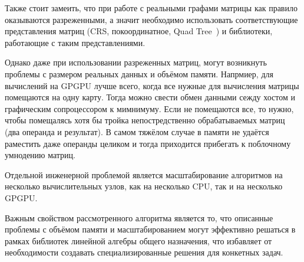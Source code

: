 Также стоит замеить, что при работе с реальными графами матрицы как правило оказываются разреженными, а значит необходимо использовать соответствующие представления матриц (CRS, покоординатное, Quad Tree~\cite{quadtree}) и библиотеки, работающие с таким представлениями. 

Однако даже при использовании разреженных матриц, могут возникнуть проблемы с размером реальных данных и объёмом памяти. Напрмиер, для вычислений на GPGPU лучше всего, когда все нужные для вычисления матрицы помещаются на одну карту. Тогда можно свести обмен данными сежду хостом и графическим сопроцессором к мимнимуму. Если не помещаются все, то нужно, чтобы помещалясь хотя бы тройка непостредственно обрабатываемых матриц (два операнда и результат). В самом тяжёлом случае в памяти не удаётся раместить даже операнды целиком и тогда приходится прибегать к поблочному умнодению матриц.

Отдельной инженерной проблемой является масштабирование алгоритмов на несколько вычислительных узлов, как на несколько CPU, так и на несколько GPGPU.

Важным свойством рассмотренного алгоритма является то, что описанные проблемы с объёмом памяти и масштабированием могут эффективно решаться в рамках библиотек линейной алгебры общего назначения, что избавляет от необходимости создавать специализированные решения для конкетных задач. 


